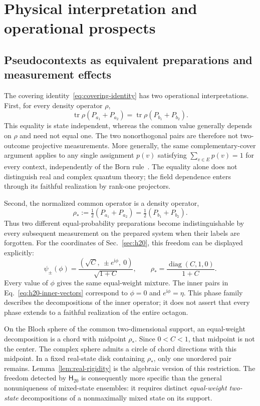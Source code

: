 \documentclass[twocolumn,aps,pra,floatfix,amsmath,amssymb,longbibliography]{revtex4-2}
\theoremstyle{definition}
\theoremstyle{remark}
\newcommand{\ii}{\mathrm{i}}
\newcommand{\Htwenty}{\mathsf H_{20}}
\begin{document}
\section{Physical interpretation and operational prospects}
\label{sec:physical}

\subsection{Pseudocontexts as equivalent preparations and measurement effects}

The covering identity~\eqref{eq:covering-identity} has two operational
interpretations.  First, for every density operator $\rho$,
\[
 \operatorname{tr}\rho(P_{a_1}+P_{a_2})
 =\operatorname{tr}\rho(P_{b_1}+P_{b_2}).
\]
This equality is state independent, whereas the common value generally
depends on $\rho$ and need not equal one.  The two nonorthogonal pairs
are therefore not two-outcome projective measurements.  More generally,
the same complementary-cover argument applies to any single assignment
$p(v)$ satisfying $\sum_{v\in E}p(v)=1$ for every context, independently of
the Born rule~\cite{2026-Navara-Svozil-pseudocontexts}.  The equality alone
does not distinguish real and complex quantum theory; the field dependence
enters through its faithful realization by rank-one projectors.

Second, the normalized common operator is a density operator,
\[
 \rho_*:=\tfrac12(P_{a_1}+P_{a_2})
        =\tfrac12(P_{b_1}+P_{b_2}).
\]
Thus two different equal-probability preparations become indistinguishable
by every subsequent measurement on the prepared system when their labels
are forgotten.  For the
coordinates of Sec.~\ref{sec:h20}, this freedom can be displayed explicitly:
\[
 \psi_\pm(\phi)=\frac{(\sqrt C,\ \pm e^{\ii\phi},\ 0)}{\sqrt{1+C}},
 \qquad
 \rho_* =\frac{\operatorname{diag}(C,1,0)}{1+C}.
\]
Every value of $\phi$ gives the same equal-weight mixture.  The inner pairs
in Eq.~\eqref{eq:h20-inner-vectors} correspond to $\phi=0$ and
$e^{\ii\phi}=\eta$.
This phase family describes the decompositions of the inner operator;
it does not assert that every phase extends to a faithful realization of
the entire octagon.

On the Bloch sphere of the common two-dimensional support, an equal-weight
decomposition is a chord with midpoint $\rho_*$.  Since $0<C<1$, that
midpoint is not the center.  The complex sphere admits a circle of chord
directions with this midpoint.  In a fixed real-state disk containing
$\rho_*$, only one unordered pair remains.  Lemma~\ref{lem:real-rigidity}
is the algebraic version of this restriction.  The freedom detected by
$\Htwenty$ is consequently more specific than the general nonuniqueness of
mixed-state ensembles: it requires distinct \emph{equal-weight two-state}
decompositions of a nonmaximally mixed state on its support.
\end{document}
